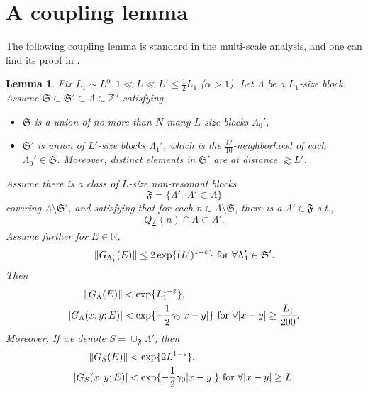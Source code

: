 \documentclass[11pt,reqno,UTF8,twoside]{amsart}
\newcommand{\Z}{\mathbb{Z}}
\newcommand{\R}{\mathbb{R}}
\newcommand{\mcA}{\mathcal{A}}
\newtheorem{lem}[thm]{Lemma}
\theoremstyle{definition}
\numberwithin{equation}{section}
\begin{document}
\section{A coupling lemma}

The following coupling lemma is standard in the multi-scale analysis, and one can find its proof in \cite[Lemma 3.1, Remark 3.6]{LSZ25}.

\begin{lem}\label{coupling lemma}
Fix $L_1\sim L^{\alpha },1\ll L\ll L' \leq \frac{1}{2} L_1$ ($\alpha>1$).  Let $\Lambda$ be a $L_1$-size block. Assume $\mathfrak{S} \subset \mathfrak{S}' \subset \Lambda\subset \Z^d$ satisfying %
\begin{itemize}
  \item $\mathfrak{S}$ is a union of no more than $N$ many $L$-size blocks $\Lambda_0'$,
  \item $\mathfrak{S}'$ is union of $L'$-size blocks $\Lambda_1'$, which is the $\frac{L'}{10}$-neighborhood of each $\Lambda_0'\in \mathfrak{S}$. Moreover, distinct elements in $\mathfrak{S}'$ are at distance $\gtrsim L'$.
\end{itemize}
 Assume there is  a class of $L $-size non-resonant blocks  
\[\mathfrak F=\{\Lambda':\ \Lambda'\subset \Lambda\}\]
covering $\Lambda\setminus \mathfrak{S}'$, and satisfying that for each $n\in \Lambda\setminus \mathfrak{S}$, there is a $\Lambda'\in \mathfrak F$ s.t.,  
      \begin{equation}\label{good block nhd}
        Q_{\frac{L}{5}}(n)\cap \Lambda \subset \Lambda'.
      \end{equation}
Assume further for $E\in\R$, 
  \begin{equation}\label{center block L2 estimate}
           \| G_{\Lambda_1'} (E)\| \leq  2\exp\{(L')^{1-\varepsilon}\} \ {\rm for} \ \forall \Lambda_{1}' \in \mathfrak{S}'. 
  \end{equation}
Then %
\begin{align}
\label{annuls L2 norm}  \| G_{\Lambda}(E)\| &<\exp \{  L_1^{1-\varepsilon}\}, \\
\label{annuls off-diagonal decay}  |G_{\Lambda}(x,y;E)| &<\exp \{-\frac12 \gamma_0 |x-y|\} \ {\rm for}\ \forall |x-y|\geq \frac{L_1}{200}. 
\end{align}
Moreover, If we denote $S=\cup_{\mathfrak{F}}\Lambda'$, then 
\begin{align}
\label{covering annuls L2 norm}  \| G_{S}(E)\| &<\exp \{  2 L^{1-\varepsilon}\}, \\
\label{covering annuls off-diagonal decay}  |G_{S}(x,y;E)| &<\exp \{-\frac12 \gamma_0 |x-y|\} \ {\rm for}\ \forall |x-y|\geq L. 
\end{align}
\end{lem}
\end{document}
